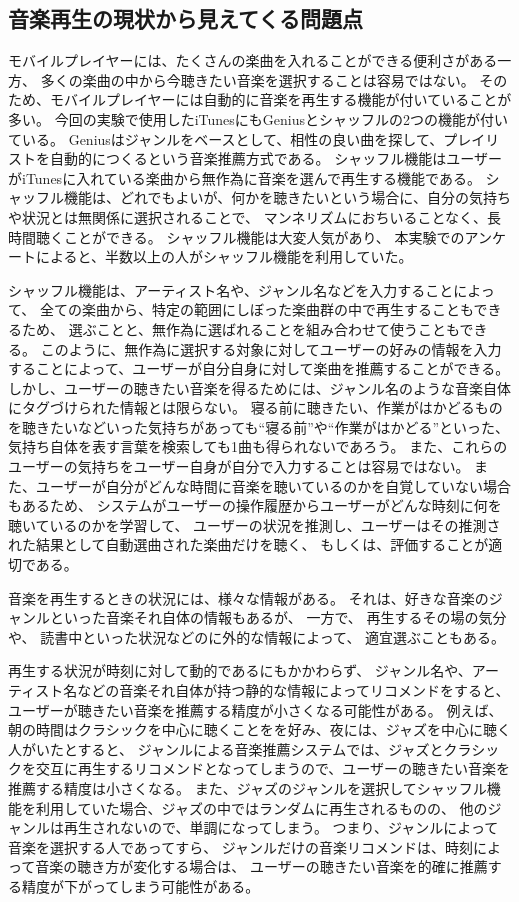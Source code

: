 \documentclass[11pt, onecolumn]{jsarticle}
\begin{document}
\subsection{音楽再生の現状から見えてくる問題点}
モバイルプレイヤーには、たくさんの楽曲を入れることができる便利さがある一方、
多くの楽曲の中から今聴きたい音楽を選択することは容易ではない。
そのため、モバイルプレイヤーには自動的に音楽を再生する機能が付いていることが多い。
今回の実験で使用したiTunesにもGeniusとシャッフルの2つの機能が付いている。
Geniusはジャンルをベースとして、相性の良い曲を探して、プレイリストを自動的につくるという音楽推薦方式である。
シャッフル機能はユーザーがiTunesに入れている楽曲から無作為に音楽を選んで再生する機能である。
シャッフル機能は、どれでもよいが、何かを聴きたいという場合に、自分の気持ちや状況とは無関係に選択されることで、
マンネリズムにおちいることなく、長時間聴くことができる。
シャッフル機能は大変人気があり、
本実験でのアンケートによると、半数以上の人がシャッフル機能を利用していた。

シャッフル機能は、アーティスト名や、ジャンル名などを入力することによって、
全ての楽曲から、特定の範囲にしぼった楽曲群の中で再生することもできるため、
選ぶことと、無作為に選ばれることを組み合わせて使うこともできる。
このように、無作為に選択する対象に対してユーザーの好みの情報を入力することによって、ユーザーが自分自身に対して楽曲を推薦することができる。
しかし、ユーザーの聴きたい音楽を得るためには、ジャンル名のような音楽自体にタグづけられた情報とは限らない。
寝る前に聴きたい、作業がはかどるものを聴きたいなどいった気持ちがあっても``寝る前''や``作業がはかどる''といった、気持ち自体を表す言葉を検索しても1曲も得られないであろう。
また、これらのユーザーの気持ちをユーザー自身が自分で入力することは容易ではない。
また、ユーザーが自分がどんな時間に音楽を聴いているのかを自覚していない場合もあるため、
システムがユーザーの操作履歴からユーザーがどんな時刻に何を聴いているのかを学習して、
ユーザーの状況を推測し、ユーザーはその推測された結果として自動選曲された楽曲だけを聴く、
もしくは、評価することが適切である。

音楽を再生するときの状況には、様々な情報がある。
それは、好きな音楽のジャンルといった音楽それ自体の情報もあるが、
一方で、
再生するその場の気分や、
読書中といった状況などのに外的な情報によって、
適宜選ぶこともある。

再生する状況が時刻に対して動的であるにもかかわらず、
ジャンル名や、アーティスト名などの音楽それ自体が持つ静的な情報によってリコメンドをすると、
ユーザーが聴きたい音楽を推薦する精度が小さくなる可能性がある。
例えば、朝の時間はクラシックを中心に聴くことをを好み、夜には、ジャズを中心に聴く人がいたとすると、
ジャンルによる音楽推薦システムでは、ジャズとクラシックを交互に再生するリコメンドとなってしまうので、ユーザーの聴きたい音楽を推薦する精度は小さくなる。
また、ジャズのジャンルを選択してシャッフル機能を利用していた場合、ジャズの中ではランダムに再生されるものの、
他のジャンルは再生されないので、単調になってしまう。
つまり、ジャンルによって音楽を選択する人であってすら、
ジャンルだけの音楽リコメンドは、時刻によって音楽の聴き方が変化する場合は、
ユーザーの聴きたい音楽を的確に推薦する精度が下がってしまう可能性がある。
\end{document}
